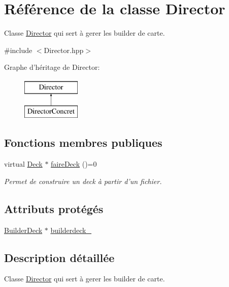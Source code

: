 \hypertarget{class_director}{\section{Référence de la classe Director}
\label{class_director}
}


Classe \hyperlink{class_director}{Director} qui sert à gerer les builder de carte.  




{\ttfamily \#include $<$Director.\-hpp$>$}

Graphe d'héritage de Director\-:\begin{figure}[H]
\begin{center}
\leavevmode
\includegraphics[height=2.000000cm]{class_director}
\end{center}
\end{figure}
\subsection*{Fonctions membres publiques}
\begin{DoxyCompactItemize}
\item 
virtual \hyperlink{class_deck}{Deck} $\ast$ \hyperlink{class_director_aea0cbfa1badb2688676406bf47fc7b62}{faire\-Deck} ()=0
\begin{DoxyCompactList}\small\item\em Permet de construire un deck à partir d'un fichier. \end{DoxyCompactList}\end{DoxyCompactItemize}
\subsection*{Attributs protégés}
\begin{DoxyCompactItemize}
\item 
\hyperlink{class_builder_deck}{Builder\-Deck} $\ast$ \hyperlink{class_director_aab69d1e289d61bf63407e8c1554a0c09}{builderdeck\-\_\-}
\end{DoxyCompactItemize}


\subsection{Description détaillée}
Classe \hyperlink{class_director}{Director} qui sert à gerer les builder de carte. 

